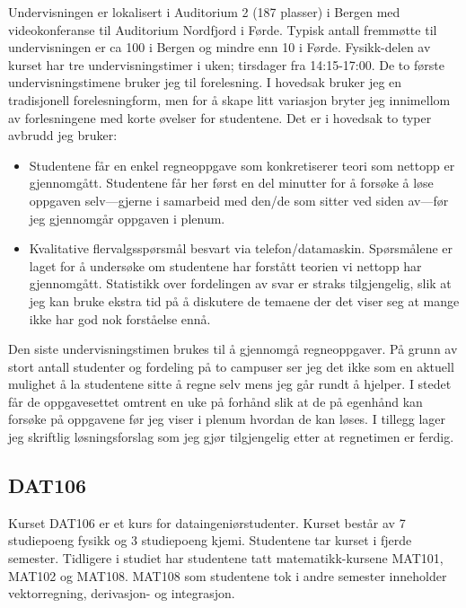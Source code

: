 \documentclass[a4paper,norsk,12pt]{report}
\begin{document}
Undervisningen er lokalisert i Auditorium 2 (187 plasser) i Bergen med videokonferanse til Auditorium Nordfjord i Førde. Typisk antall fremmøtte til undervisningen er ca 100 i Bergen og mindre enn 10 i Førde. Fysikk-delen av kurset har tre undervisningstimer i uken; tirsdager fra 14:15-17:00. De to første undervisningstimene bruker jeg til forelesning. I hovedsak bruker jeg en tradisjonell forelesningform, men for å skape litt variasjon bryter jeg innimellom av forlesningene med korte øvelser for studentene. Det er i hovedsak to typer avbrudd jeg bruker:
\begin{itemize}
\item
Studentene får en enkel regneoppgave som konkretiserer teori som nettopp er gjennomgått. Studentene får her først en del minutter for å forsøke å løse oppgaven selv---gjerne i samarbeid med den/de som sitter ved siden av---før jeg gjennomgår oppgaven i plenum.
\item
Kvalitative flervalgsspørsmål besvart via telefon/datamaskin. Spørsmålene er laget for å undersøke om studentene har forstått teorien vi nettopp har gjennomgått. Statistikk over fordelingen av svar er straks tilgjengelig, slik at jeg kan bruke ekstra tid på å diskutere de temaene der det viser seg at mange ikke har god nok forståelse ennå.
\end{itemize}
Den siste undervisningstimen brukes til å gjennomgå regneoppgaver. På grunn av stort antall studenter og fordeling på to campuser ser jeg det ikke som en aktuell mulighet å la studentene sitte å regne selv mens jeg går rundt å hjelper. I stedet får de oppgavesettet omtrent en uke på forhånd slik at de på egenhånd kan forsøke på oppgavene før jeg viser i plenum hvordan de kan løses. I tillegg lager jeg skriftlig løsningsforslag som jeg gjør tilgjengelig etter at regnetimen er ferdig.

\subsection{DAT106}
Kurset DAT106 er et kurs for dataingeniørstudenter. Kurset består av 7 studiepoeng fysikk og 3 studiepoeng kjemi. Studentene tar kurset i fjerde semester. Tidligere i studiet har studentene tatt matematikk-kursene MAT101, MAT102 og MAT108. MAT108 som studentene tok i andre semester inneholder vektorregning, derivasjon- og integrasjon.
\end{document}
